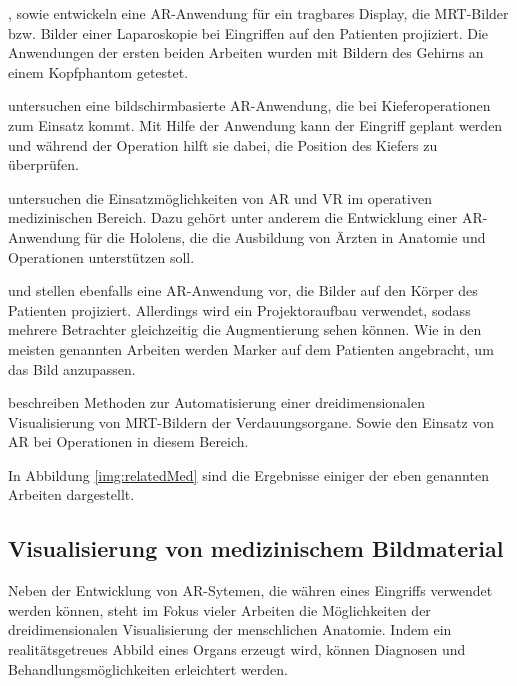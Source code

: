 \cite{Wendt03}, \cite{Maurer01} sowie \cite{fuchs98} entwickeln eine AR-Anwendung für ein tragbares Display, die MRT-Bilder bzw. Bilder einer Laparoskopie bei Eingriffen auf den Patienten projiziert. Die Anwendungen der ersten beiden Arbeiten wurden mit Bildern des Gehirns an einem Kopfphantom getestet.

\cite{MISCHKOWSKI2006478} untersuchen eine bildschirmbasierte AR-Anwendung, die bei Kieferoperationen zum Einsatz kommt. Mit Hilfe der Anwendung kann der Eingriff geplant werden und während der Operation hilft sie dabei, die Position des Kiefers zu überprüfen. 

\cite{GasquesRodrigues17} untersuchen die Einsatzmöglichkeiten von AR und VR im operativen medizinischen Bereich. Dazu gehört unter anderem die Entwicklung einer AR-Anwendung für die Hololens, die die Ausbildung von Ärzten in Anatomie und Operationen unterstützen soll. 

\cite{Watts17} und \cite{Tabrizi15} stellen ebenfalls eine AR-Anwendung vor, die Bilder auf den Körper des Patienten projiziert. Allerdings wird ein Projektoraufbau verwendet, sodass mehrere Betrachter gleichzeitig die Augmentierung sehen können. Wie in den meisten genannten Arbeiten werden Marker auf dem Patienten angebracht, um das Bild anzupassen.

\cite{Soler04} beschreiben Methoden zur Automatisierung einer dreidimensionalen Visualisierung von MRT-Bildern der Verdauungsorgane. Sowie den Einsatz von AR bei Operationen in diesem Bereich. 

In Abbildung \ref{img:relatedMed} sind die Ergebnisse einiger der eben genannten Arbeiten dargestellt.

\subsection{Visualisierung von medizinischem Bildmaterial}

Neben der Entwicklung von AR-Sytemen, die währen eines Eingriffs verwendet werden können, steht im Fokus vieler Arbeiten die Möglichkeiten der dreidimensionalen Visualisierung der menschlichen Anatomie. Indem ein realitätsgetreues Abbild eines Organs erzeugt wird, können Diagnosen und Behandlungsmöglichkeiten erleichtert werden.

